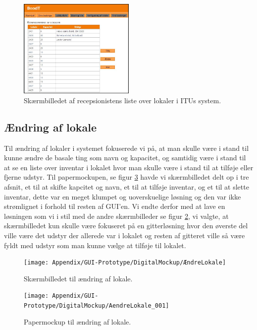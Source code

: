 \begin{figure}[h!]
  \centering
    \includegraphics[width=0.5\textwidth]{Appendix/GUI-Prototype/DigitalMockup/LokaleListe}
  \caption{Skærmbilledet af recepsionistens liste over lokaler i ITUs system.}
\label{Design_G_Development_LokaleListe_Final}
\end{figure} 

\subsection{Ændring af lokale}
Til ændring af lokaler i systemet fokuserede vi på, at man skulle være i stand til kunne ændre de basale ting som navn og kapacitet, og samtidig være i stand til at se en liste over inventar i lokalet hvor man skulle være i stand til at tilføje eller fjerne udstyr. Til papermockupen, se figur \ref{Design_G_Development_ÆndreLokale} havde vi skærmbilledet delt op i tre afsnit, et til at skifte kapcitet og navn, et til at tilføje inventar, og et til at slette inventar, dette var en meget klumpet og uoverskuelige løsning og den var ikke strømlignet i forhold til resten af GUI'en. Vi endte derfor med at lave en løsningen som vi i stil med de andre skærmbilleder se figur \ref{Design_G_Development_ÆndreLokale_Final}, vi valgte, at skærmbilledet kun skulle være fokuseret på en gitterløsning hvor den øverste del ville være det udstyr der allerede var i lokalet og resten af gitteret ville så være fyldt med udstyr som man kunne vælge at tilføje til lokalet.

\begin{figure}[h!]
  \centering
    \texttt{[image: Appendix/GUI-Prototype/DigitalMockup/ÆndreLokale]}
  \caption{Skærmbilledet til ændring af lokale.}
\label{Design_G_Development_ÆndreLokale_Final}
\end{figure} 

\begin{figure}[h!]
  \centering
    \texttt{[image: Appendix/GUI-Prototype/DigitalMockup/AendreLokale\_001]}
  \caption{Papermockup til ændring af lokale.}
\label{Design_G_Development_ÆndreLokale}
\end{figure} 